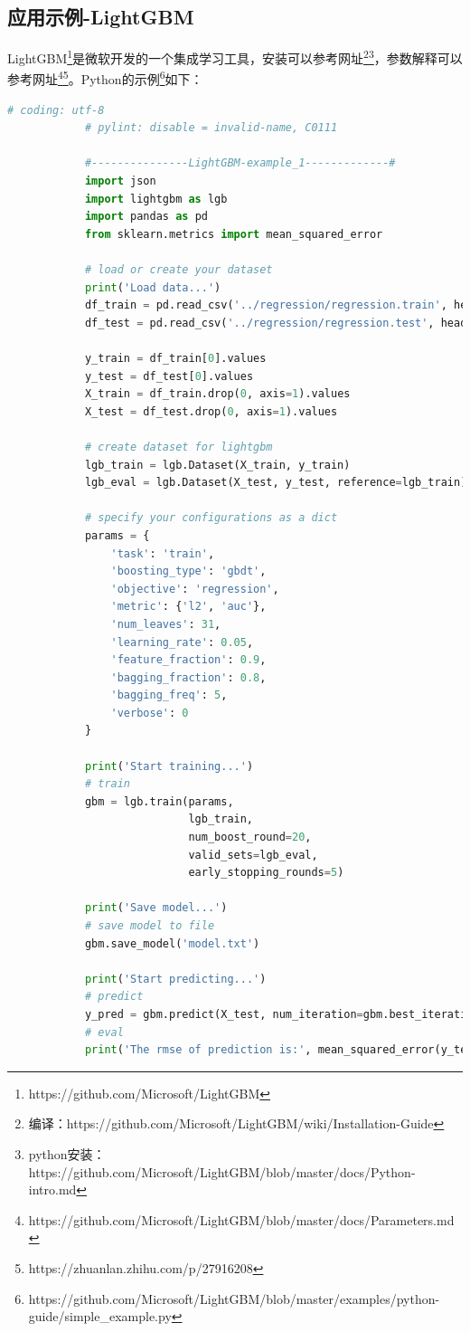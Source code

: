         \subsection{应用示例-LightGBM}
            \par
            LightGBM\footnote{https://github.com/Microsoft/LightGBM}是微软开发的一个集成学习工具，安装可以参考网址\footnote{编译：https://github.com/Microsoft/LightGBM/wiki/Installation-Guide}\footnote{python安装：https://github.com/Microsoft/LightGBM/blob/master/docs/Python-intro.md}，参数解释可以参考网址\footnote{https://github.com/Microsoft/LightGBM/blob/master/docs/Parameters.md}\footnote{https://zhuanlan.zhihu.com/p/27916208}。Python的示例\footnote{https://github.com/Microsoft/LightGBM/blob/master/examples/python-guide/simple\_example.py}如下：
            \begin{lstlisting}[language = Python]
            # coding: utf-8
            # pylint: disable = invalid-name, C0111

            #---------------LightGBM-example_1-------------#
            import json
            import lightgbm as lgb
            import pandas as pd
            from sklearn.metrics import mean_squared_error

            # load or create your dataset
            print('Load data...')
            df_train = pd.read_csv('../regression/regression.train', header=None, sep='\t')
            df_test = pd.read_csv('../regression/regression.test', header=None, sep='\t')

            y_train = df_train[0].values
            y_test = df_test[0].values
            X_train = df_train.drop(0, axis=1).values
            X_test = df_test.drop(0, axis=1).values

            # create dataset for lightgbm
            lgb_train = lgb.Dataset(X_train, y_train)
            lgb_eval = lgb.Dataset(X_test, y_test, reference=lgb_train)

            # specify your configurations as a dict
            params = {
                'task': 'train',
                'boosting_type': 'gbdt',
                'objective': 'regression',
                'metric': {'l2', 'auc'},
                'num_leaves': 31,
                'learning_rate': 0.05,
                'feature_fraction': 0.9,
                'bagging_fraction': 0.8,
                'bagging_freq': 5,
                'verbose': 0
            }

            print('Start training...')
            # train
            gbm = lgb.train(params,
                            lgb_train,
                            num_boost_round=20,
                            valid_sets=lgb_eval,
                            early_stopping_rounds=5)

            print('Save model...')
            # save model to file
            gbm.save_model('model.txt')

            print('Start predicting...')
            # predict
            y_pred = gbm.predict(X_test, num_iteration=gbm.best_iteration)
            # eval
            print('The rmse of prediction is:', mean_squared_error(y_test, y_pred) ** 0.5)
            \end{lstlisting}
